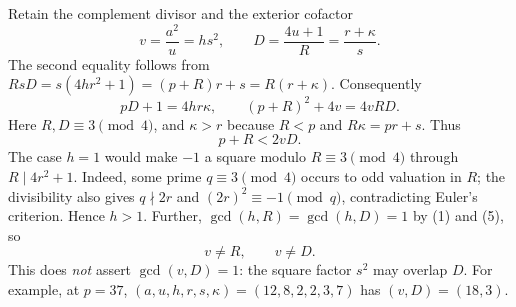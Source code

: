Retain the complement divisor and the exterior cofactor
\[
 \boxed{v=\frac{a^2}{u}=hs^2,\qquad
 D=\frac{4u+1}{R}=\frac{r+\kappa}{s}.}                   \tag{4}
\]
The second equality follows from
$RsD=s(4hr^2+1)=(p+R)r+s=R(r+\kappa)$.
Consequently
\[
 \boxed{pD+1=4hr\kappa,\qquad
 (p+R)^2+4v=4vRD.}                                     \tag{5}
\]
Here $R,D\equiv3\pmod4$, and $\kappa>r$ because $R<p$ and
$R\kappa=pr+s$. Thus
\[
 \boxed{p+R<2vD.}                                       \tag{6}
\]
The case $h=1$ would make $-1$ a square modulo $R\equiv3\pmod4$ through
$R\mid4r^2+1$.  Indeed, some prime $q\equiv3\pmod4$ occurs to odd
valuation in $R$; the divisibility also gives $q\nmid2r$ and
$(2r)^2\equiv-1\pmod q$, contradicting Euler's criterion.  Hence $h>1$.
Further,
$\gcd(h,R)=\gcd(h,D)=1$ by (1) and (5), so
\[
 \boxed{v\ne R,\qquad v\ne D.}                         \tag{7}
\]
This does \emph{not} assert $\gcd(v,D)=1$: the square factor $s^2$ may overlap
$D$. For example, at $p=37$, $(a,u,h,r,s,\kappa)=(12,8,2,2,3,7)$ has
$(v,D)=(18,3)$.

